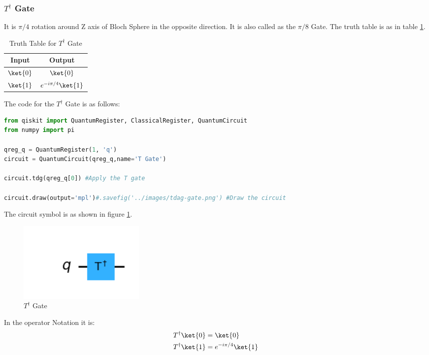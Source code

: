 \documentclass[12pt, oneside]{book}
\theoremstyle{definition}
\theoremstyle{definition}
\theoremstyle{remark}
\begin{document}
\subsubsection{$T^{\dagger}$ Gate}
It is $\pi/4$ rotation around Z axis of Bloch Sphere in the opposite direction.
It is also called as the $\pi/8$ Gate. The truth table is as in table \ref{tab:t-dagger}.
\begin{table}[H]
    \centering
    \begin{tabular}{|c|c|}
        \hline
        Input & Output\\
        \hline
        $\ket{0}$ & $\ket{0}$\\
        $\ket{1}$ & $e^{-i\pi/4}\ket{1}$\\
        \hline
    \end{tabular}
    \caption{Truth Table for $T^{\dagger}$ Gate}
    \label{tab:t-dagger}
\end{table}

The code for the $T^{\dagger}$ Gate is as follows:
\begin{lstlisting}[language=Python]
from qiskit import QuantumRegister, ClassicalRegister, QuantumCircuit
from numpy import pi

qreg_q = QuantumRegister(1, 'q')
circuit = QuantumCircuit(qreg_q,name='T Gate')

circuit.tdg(qreg_q[0]) #Apply the T gate

circuit.draw(output='mpl')#.savefig('../images/tdag-gate.png') #Draw the circuit
\end{lstlisting}

The circuit symbol is as shown in figure \ref{fig:t-dagger}.
\begin{figure}[H]
    \centering
    \includegraphics[width=0.3\textwidth]{../images/tdag-gate.png}
    \caption{$T^{\dagger}$ Gate}
    \label{fig:t-dagger}
\end{figure}

In the operator Notation it is:
\begin{align*}
    T^{\dagger}\ket{0}&=\ket{0} \\
    T^{\dagger}\ket{1}&=e^{-i\pi/4}\ket{1}
\end{align*}
\end{document}
